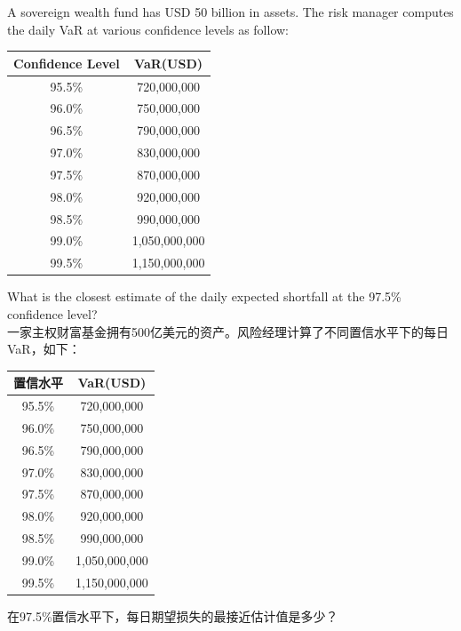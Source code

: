 \documentclass{article}
\newcounter{question} %
\begin{document}
\begin{question}
    A sovereign wealth fund has USD 50 billion in assets. The risk manager computes the daily VaR at
    various confidence levels as follow:
    \begin{table}[H]
        \centering
        \begin{tabular}{|c|c|}
            \hline
            Confidence Level & VaR(USD) \\
            \hline
            95.5\% & 720,000,000 \\
            96.0\% & 750,000,000 \\
            96.5\% & 790,000,000 \\
            97.0\% & 830,000,000 \\
            97.5\% & 870,000,000 \\
            98.0\% & 920,000,000 \\
            98.5\% & 990,000,000 \\
            99.0\% & 1,050,000,000 \\
            99.5\% & 1,150,000,000 \\
            \hline
        \end{tabular}
    \end{table}

    What is the closest estimate of the daily expected shortfall at the 97.5\% confidence level?\\
    一家主权财富基金拥有500亿美元的资产。风险经理计算了不同置信水平下的每日VaR，如下：
    \begin{table}[H]
        \centering
        \begin{tabular}{|c|c|}
            \hline
            置信水平 & VaR(USD) \\
            \hline
            95.5\% & 720,000,000 \\
            96.0\% & 750,000,000 \\
            96.5\% & 790,000,000 \\
            97.0\% & 830,000,000 \\
            97.5\% & 870,000,000 \\
            98.0\% & 920,000,000 \\
            98.5\% & 990,000,000 \\
            99.0\% & 1,050,000,000 \\
            99.5\% & 1,150,000,000 \\
            \hline
        \end{tabular}
    \end{table}

    在97.5\%置信水平下，每日期望损失的最接近估计值是多少？
\end{question}
\end{document}
